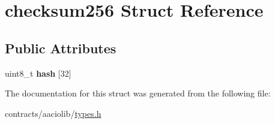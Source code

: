 \hypertarget{structchecksum256}{}\section{checksum256 Struct Reference}
\label{structchecksum256}
\subsection*{Public Attributes}
\begin{DoxyCompactItemize}
\item 
\mbox{\label{structchecksum256_a3d7fafd3ed96c4b4fd80d9038fe69849}} 
uint8\+\_\+t {\bfseries hash} \mbox{[}32\mbox{]}
\end{DoxyCompactItemize}


The documentation for this struct was generated from the following file\+:\begin{DoxyCompactItemize}
\item 
contracts/aaciolib/\mbox{\hyperlink{contracts_2aaciolib_2types_8h}{types.\+h}}\end{DoxyCompactItemize}
